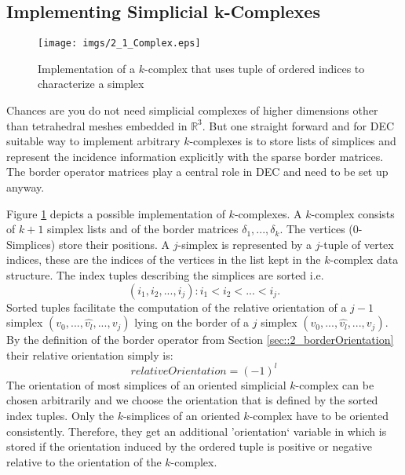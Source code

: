 

\subsection{Implementing Simplicial k-Complexes }

\begin{figure}[t]
	\begin{center}
	\texttt{[image: imgs/2\_1\_Complex.eps]}%
	\end{center}
	\caption{Implementation of a $k$-complex that uses tuple of ordered indices to characterize a simplex}%
	\label{fig::2_1_Complex}%
\end{figure}

Chances are you do not need simplicial complexes of higher dimensions other than tetrahedral meshes embedded in $\mathbb R^3$. But one straight forward and for DEC suitable way to implement arbitrary $k$-complexes is to store lists of simplices and represent the incidence information explicitly with the sparse border matrices. The border operator matrices play a central role in DEC and need to be set up anyway.

Figure \ref{fig::2_1_Complex} depicts a possible implementation of $k$-complexes.  A $k$-complex consists of $k+1$ simplex lists and of the border matrices $\delta_1,...,\delta_k$. The vertices (0-Simplices) store their positions. A $j$-simplex is represented by a $j$-tuple of vertex indices, these are the indices of the vertices in the list kept in the $k$-complex data structure. The index tuples describing the simplices are sorted i.e.
\[(i_1,i_2,...,i_j): i_1 < i_2 <...<i_j.\] 
Sorted tuples facilitate the computation of the relative orientation of a $j-1$ simplex $(v_0,...,\widehat{v_l},..., v_{j})$ lying on the border of a $j$ simplex $(v_0,...,\widehat{v_l},..., v_{j})$. By the definition of the border operator from Section \ref{sec::2_borderOrientation} their relative orientation simply is:
\[relativeOrientation = (-1)^l\]
The orientation of most simplices of an oriented simplicial $k$-complex can be chosen arbitrarily and we choose the orientation that is defined by the sorted index tuples. Only the $k$-simplices of an oriented $k$-complex have to be oriented consistently. Therefore, they get an additional 'orientation` variable in which is stored if the orientation induced by the ordered tuple is positive or negative relative to the orientation of the $k$-complex.



